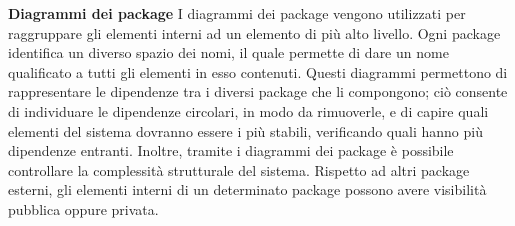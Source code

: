 						\textbf{Diagrammi dei package}
						\newline
						\newline
						\hangindent=0.6cm I diagrammi dei package vengono utilizzati per raggruppare gli elementi interni ad un elemento di più alto livello. Ogni package identifica un diverso spazio dei nomi, il quale permette di dare un nome qualificato a tutti gli elementi in esso contenuti.
						\newline
						\hangindent=0.6cm Questi diagrammi permettono di rappresentare le dipendenze tra i diversi package che li compongono; ciò consente di individuare le dipendenze circolari, in modo da rimuoverle, e di capire quali elementi del sistema dovranno essere i più stabili, verificando quali hanno più dipendenze entranti. Inoltre, tramite i diagrammi dei package è possibile controllare la complessità strutturale del sistema.
						\newline
						\hangindent=0.6cm Rispetto ad altri package esterni, gli elementi interni di un determinato package possono avere visibilità pubblica oppure privata.


